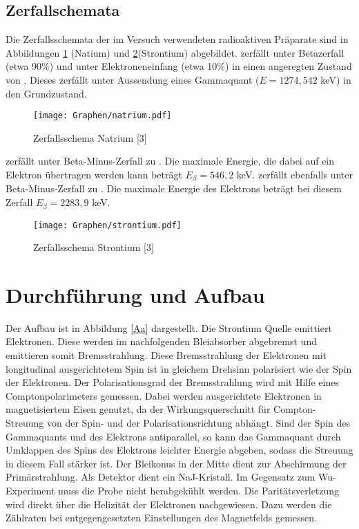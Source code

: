 \documentclass[twoside,colorback,accentcolor=tud4c,11pt]{tudreport}
\begin{document}
\section{Zerfallschemata}
Die Zerfallsschemata der im Versuch verwendeten radioaktiven Präparate sind in Abbildungen \ref{V_2.8a} (Natium) und \ref{V_2.8b}(Strontium) abgebildet.  zerfällt unter Betazerfall (etwa 90\%) und unter Elektroneneinfang (etwa 10\%) in einen angeregten Zustand von . Dieses zerfällt unter Aussendung eines Gammaquant ($E=1274,542$ keV) in den Grundzustand.
\begin{figure}[H]
\centering
   	\begin{minipage}[b]{0.7\textwidth}
   	\texttt{[image: Graphen/natrium.pdf]}
   	\caption{Zerfallsschema Natrium [3]}
  	\label{V_2.8a}
   	\end{minipage}
\end{figure}
 zerfällt unter Beta-Minus-Zerfall zu . Die maximale Energie, die dabei auf ein Elektron übertragen werden kann beträgt $E_{\beta}=546,2$ keV.  zerfällt ebenfalls unter Beta-Minus-Zerfall zu . Die maximale Energie des Elektrons beträgt bei diesem Zerfall $E_{\beta}=2283,9$ keV.
\begin{figure}[H]
\centering
   	\begin{minipage}[b]{0.7\textwidth}
   	\texttt{[image: Graphen/strontium.pdf]}
   	\caption{Zerfallsschema Strontium [3]}
  	\label{V_2.8b}
   	\end{minipage}
\end{figure}
	
	
\chapter{Durchführung und Aufbau}
Der Aufbau ist in Abbildung \ref{Aa} dargestellt. Die Strontium Quelle emittiert Elektronen. Diese werden im nachfolgenden Bleiabsorber abgebremst und emittieren somit Bremsstrahlung. Diese Bremsstrahlung der Elektronen mit longitudinal ausgerichtetem Spin ist in gleichem Drehsinn polarisiert wie der Spin der Elektronen. Der Polarisationsgrad der Bremsstrahlung wird mit Hilfe eines Comptonpolarimeters gemessen. Dabei werden ausgerichtete Elektronen in magnetisiertem Eisen genutzt, da der Wirkungsquerschnitt für Compton-Streuung von der Spin- und der Polarisationsrichtung abhängt. Sind der Spin des Gammaquants und des Elektrons antiparallel, so kann das Gammaquant durch Umklappen des Spins des Elektrons leichter Energie abgeben, sodass die Streuung in diesem Fall stärker ist. Der Bleikonus in der Mitte dient zur Abschirmung der Primärstrahlung. Als Detektor dient ein NaJ-Kristall. Im Gegensatz zum Wu-Experiment muss die Probe nicht herabgekühlt werden. Die Paritätsverletzung wird direkt über die Helizität der Elektronen nachgewiesen. Dazu werden die Zählraten bei entgegengesetzten Einstellungen des Magnetfelds gemessen.
\end{document}
